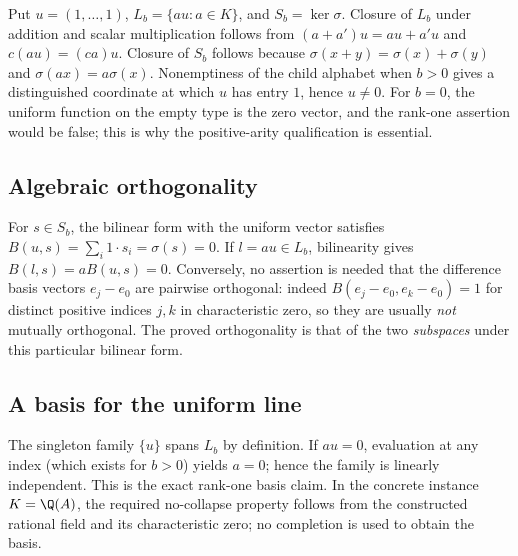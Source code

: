 Put $u=(1,\ldots,1)$, $L_b=\{au:a\in K\}$, and $S_b=\ker\sigma$. Closure of $L_b$ under addition and scalar multiplication follows from $(a+a')u=au+a'u$ and $c(au)=(ca)u$. Closure of $S_b$ follows because $\sigma(x+y)=\sigma(x)+\sigma(y)$ and $\sigma(ax)=a\sigma(x)$. Nonemptiness of the child alphabet when $b>0$ gives a distinguished coordinate at which $u$ has entry $1$, hence $u\ne0$. For $b=0$, the uniform function on the empty type is the zero vector, and the rank-one assertion would be false; this is why the positive-arity qualification is essential.

\subsection{Algebraic orthogonality}\label{supp:8-4}
\par{}\par\smallskip

For $s\in S_b$, the bilinear form with the uniform vector satisfies $B(u,s)=\sum_i 1\cdot s_i=\sigma(s)=0$. If $l=au\in L_b$, bilinearity gives $B(l,s)=aB(u,s)=0$. Conversely, no assertion is needed that the difference basis vectors $e_j-e_0$ are pairwise orthogonal: indeed $B(e_j-e_0,e_k-e_0)=1$ for distinct positive indices $j,k$ in characteristic zero, so they are usually \emph{not} mutually orthogonal. The proved orthogonality is that of the two \emph{subspaces} under this particular bilinear form.

\subsection{A basis for the uniform line}\label{supp:8-5}
\par{}\par\smallskip

The singleton family $\{u\}$ spans $L_b$ by definition. If $au=0$, evaluation at any index (which exists for $b>0$) yields $a=0$; hence the family is linearly independent. This is the exact rank-one basis claim. In the concrete instance $K=\Q(A)$, the required no-collapse property follows from the constructed rational field and its characteristic zero; no completion is used to obtain the basis.

